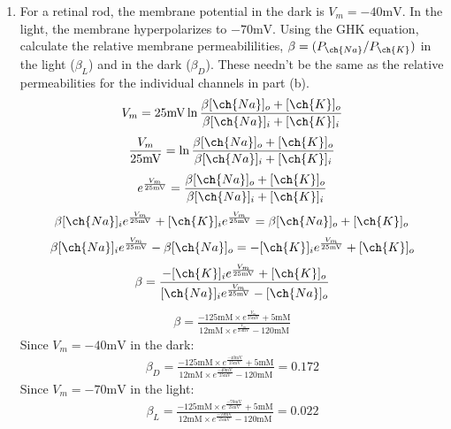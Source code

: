 \documentclass[11pt]{article}
\begin{document}
\begin{enumerate}[label=\arabic*.]
\begin{enumerate}[label=(\alph*)]
\item
For a retinal rod, the membrane potential in the dark is $V_m = -40 \text{mV}$. In the light, the membrane hyperpolarizes to $-70 \text{mV}$. Using the GHK equation, calculate the relative membrane permeabililities, $\beta = (P_{\ch{Na}} / P_{\ch{K}})$ in the light ($\beta_L$) and in the dark ($\beta_D$). These needn't be the same as the relative permeabilities for the individual channels in part (b).
\begin{align*}
V_m = 25 \text{mV} \ln{\frac{\beta [\ch{Na}]_o + [\ch{K}]_o} {\beta [\ch{Na}]_i + [\ch{K}]_i}}
\end{align*}
\begin{align*}
\frac{V_m} {25 \text{mV}} = \ln{\frac{\beta [\ch{Na}]_o + [\ch{K}]_o} {\beta [\ch{Na}]_i + [\ch{K}]_i}}
\end{align*}
\begin{align*}
e^{\frac{V_m} {25 \text{mV}}} = \frac{\beta [\ch{Na}]_o + [\ch{K}]_o} {\beta [\ch{Na}]_i + [\ch{K}]_i}
\end{align*}
\begin{align*}
\beta [\ch{Na}]_i e^{\frac{V_m} {25 \text{mV}}} + [\ch{K}]_i e^{\frac{V_m} {25 \text{mV}}} = \beta [\ch{Na}]_o + [\ch{K}]_o
\end{align*}
\begin{align*}
\beta [\ch{Na}]_i e^{\frac{V_m} {25 \text{mV}}} - \beta [\ch{Na}]_o = -[\ch{K}]_i e^{\frac{V_m} {25 \text{mV}}} + [\ch{K}]_o
\end{align*}
\begin{align*}
\beta = \frac{-[\ch{K}]_i e^{\frac{V_m} {25 \text{mV}}} + [\ch{K}]_o} {[\ch{Na}]_i e^{\frac{V_m} {25 \text{mV}}} - [\ch{Na}]_o}
\end{align*}
\begin{align*}
\beta = \frac{-125 \text{mM} \times e^{\frac{V_m} {25 \text{mV}}} + 5 \text{mM}} {12 \text{mM} \times e^{\frac{V_m} {25 \text{mV}}} - 120 \text{mM}}
\end{align*}
Since $V_m = -40 \text{mV}$ in the dark:
\begin{align*}
\beta_{D} = \frac{-125 \text{mM} \times e^{\frac{-40 \text{mV}} {25 \text{mV}}} + 5 \text{mM}} {12 \text{mM} \times e^{\frac{-40 \text{mV}} {25 \text{mV}}} - 120 \text{mM}} = 0.172
\end{align*}
Since $V_m = -70 \text{mV}$ in the light:
\begin{align*}
\beta_{L} = \frac{-125 \text{mM} \times e^{\frac{-70 \text{mV}} {25 \text{mV}}} + 5 \text{mM}} {12 \text{mM} \times e^{\frac{-70 \text{mV}} {25 \text{mV}}} - 120 \text{mM}} = 0.022
\end{align*}




\end{enumerate}
\end{enumerate}
\end{document}
